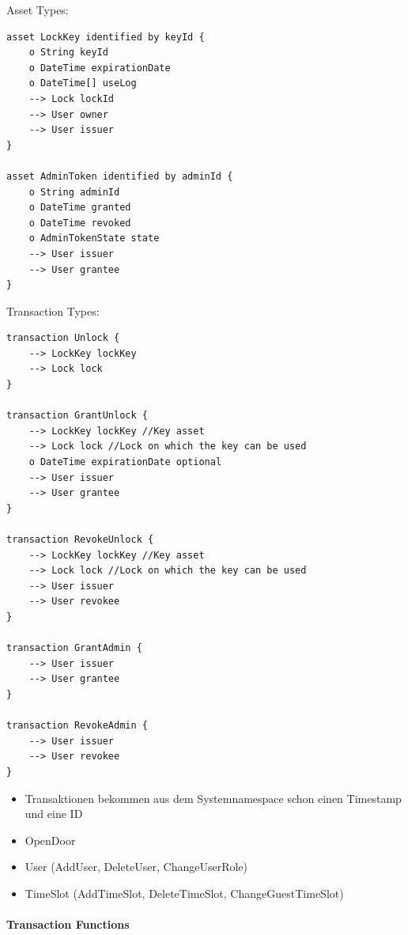             Asset Types:
            \begin{lstlisting}[caption={Asset Types},label=prototype_assets,captionpos=b]
asset LockKey identified by keyId {
    o String keyId
    o DateTime expirationDate
    o DateTime[] useLog
    --> Lock lockId
    --> User owner
    --> User issuer
}

asset AdminToken identified by adminId {
	o String adminId
	o DateTime granted
	o DateTime revoked
	o AdminTokenState state
	--> User issuer
    --> User grantee
}
            \end{lstlisting}
        
            Transaction Types:
            \begin{lstlisting}[caption={Relevante Transaktionen},label=prototype_transactions,captionpos=b]
transaction Unlock {
    --> LockKey lockKey
    --> Lock lock
}

transaction GrantUnlock {
    --> LockKey lockKey //Key asset
    --> Lock lock //Lock on which the key can be used
	o DateTime expirationDate optional
    --> User issuer
    --> User grantee
}

transaction RevokeUnlock {
    --> LockKey lockKey //Key asset
    --> Lock lock //Lock on which the key can be used
    --> User issuer
    --> User revokee
}

transaction GrantAdmin {
    --> User issuer
    --> User grantee
}

transaction RevokeAdmin {
    --> User issuer
    --> User revokee
}
            \end{lstlisting}
            
            \begin{itemize}[noitemsep]
                \item Transaktionen bekommen aus dem Systemnamespace schon einen Timestamp und eine ID
                \item OpenDoor
                \item User (AddUser, DeleteUser, ChangeUserRole)
                \item TimeSlot (AddTimeSlot, DeleteTimeSlot, ChangeGuestTimeSlot)
            \end{itemize}
    
    \paragraph{\textrm{Transaction Functions}}
    
